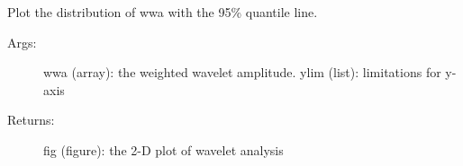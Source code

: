 \documentclass[letterpaper,10pt,english]{sphinxmanual}
\begin{document}

\begin{fulllineitems}
\label{\detokenize{Spectral:pyleoclim.Spectral.plot_wwadist}}
Plot the distribution of wwa with the 95\% quantile line.
\begin{description}
\item[{Args:}] \leavevmode
wwa (array): the weighted wavelet amplitude.
ylim (list): limitations for y-axis

\item[{Returns:}] \leavevmode
fig (figure): the 2-D plot of wavelet analysis

\end{description}

\end{fulllineitems}

\end{document}
